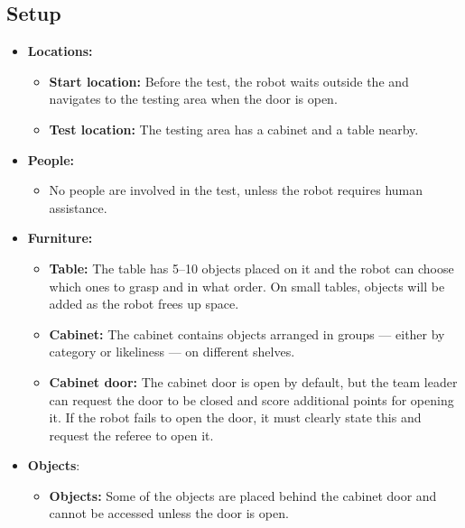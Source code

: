 \subsection*{Setup}
\begin{itemize}
	\item \textbf{Locations:}
		\begin{itemize}
			\item \textbf{Start location:} Before the test, the robot waits outside the \Arena{} and navigates to the testing area when the door is open.
			\item \textbf{Test location:} The testing area has a cabinet and a table nearby.
		\end{itemize}
	\item \textbf{People:}
		\begin{itemize}
			\item No people are involved in the test, unless the robot requires human assistance.
		\end{itemize}
	\item \textbf{Furniture:}
		\begin{itemize}
			\item \textbf{Table:} The table has 5--10 objects placed on it and the robot can choose which ones to grasp and in what order. On small tables, objects will be added as the robot frees up space.
			\item \textbf{Cabinet:} The cabinet contains objects arranged in groups --- either by category or likeliness --- on different shelves.
			\item \textbf{Cabinet door:} The cabinet door is open by default, but the team leader can request the door to be closed and score additional points for opening it. If the robot fails to open the door, it must clearly state this and request the referee to open it.
		\end{itemize}
	\item \textbf{Objects}:
		\begin{itemize}
			\item \textbf{Objects:} Some of the objects are placed behind the cabinet door and cannot be accessed unless the door is open.
		\end{itemize}
\end{itemize}


